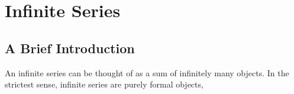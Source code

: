 \section{Infinite Series}

\subsection{A Brief Introduction}

An infinite series can be thought of as a sum of infinitely many objects. In the strictest sense, infinite series are purely formal objects, 